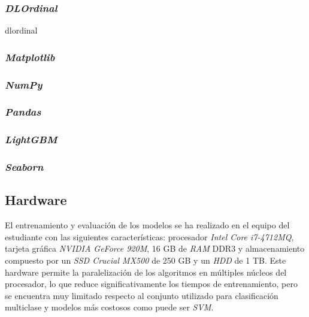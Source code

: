\subsubsection{\textit{DLOrdinal}}
\label{subsubsec:dlordinal}

dlordinal \cite{dlordinal}

\subsubsection{\textit{Matplotlib}}
\label{subsubsec:matplotlib}



\subsubsection{\textit{NumPy}}
\label{subsubsec:numpy}



\subsubsection{\textit{Pandas}}
\label{subsubsec:pandas}



\subsubsection{\textit{LightGBM}}
\label{subsubsec:lightgbm}



\subsubsection{\textit{Seaborn}}
\label{subsubsec:seaborn}



\subsection{Hardware}
\label{subsec:hw_usado}

El entrenamiento y evaluación de los modelos se ha realizado en el equipo del estudiante con las siguientes características: procesador \textit{Intel Core i7-4712MQ}, tarjeta gráfica \textit{NVIDIA GeForce 920M}, 16 GB de \textit{RAM} DDR3 y almacenamiento compuesto por un \textit{SSD Crucial MX500} de 250 GB y un \textit{HDD} de 1 TB. Este hardware permite la paralelización de los algoritmos en múltiples núcleos del procesador, lo que reduce significativamente los tiempos de entrenamiento, pero se encuentra muy limitado respecto al conjunto utilizado para clasificación multiclase y modelos más costosos como puede ser \textit{SVM}.

